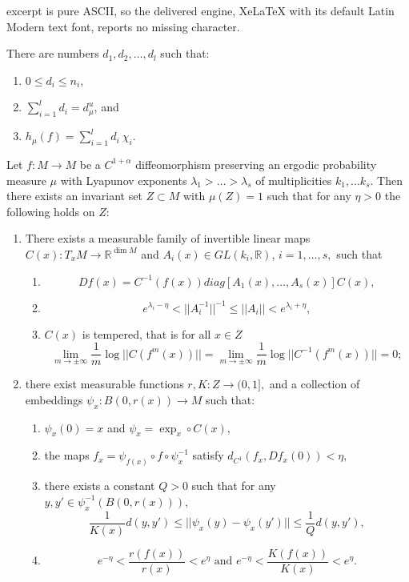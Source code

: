 \documentclass[10pt,a4paper]{amsart}
\begin{document}
excerpt is pure ASCII, so the delivered engine, XeLaTeX with its default Latin Modern text font, reports no missing character.
\begin{thm}\label{thm:LY}
There are numbers $d_1, d_2, \ldots, d_l$ such that:
\begin{enumerate}
\item $0\leq d_i\leq n_i$,
\item $\sum_{i=1}^l d_i = d_{\mu}^u$, and
\item $h_{\mu}(f)= \sum_{i=1}^l  d_i ~ \chi_i$.
\end{enumerate}
\end{thm}

\begin{thm}\label{thm:Pes}
Let $f : M \to M$ be a $C^{1+\alpha}$ diffeomorphism preserving an ergodic probability measure $\mu$
with Lyapunov exponents $\lambda_1 > \ldots > \lambda_s$ of multiplicities $k_1, \ldots k_s$.
Then there exists an invariant set $Z\subset M$ with $\mu(Z)=1$ such that for any $\eta>0$ the following holds on $Z$:
\begin{enumerate}
\item There exists a measurable family of invertible linear maps $C(x): T_xM \to \mathbb{R}^{\dim M}$ and $A_i(x)\in GL(k_i, \mathbb{R})$, $i=1, \ldots ,s,$ such that

\begin{enumerate}
\item\label{eqn:Oseledecsplit}
$$Df(x)= C^{-1}(f(x)) diag[ A_1(x), \ldots, A_s(x)  ] C(x),$$

\item\label{eqn:norms}
$$  e^{\lambda_i-\eta} < ||A_i^{-1}||^{-1} \leq ||A_i|| < e^{\lambda_i+\eta} ,  $$ 

\item\label{eqn:temp} 
$C(x)$ is tempered, that is for all $x\in Z$ $$  \lim_{m\to \pm \infty  }  \frac{1}{m}   \log ||   C(f^m(x))  ||   =    \lim_{m\to \pm \infty  }  \frac{1}{m}   \log ||   C^{-1}(f^m(x))  ||  =0;      $$
\end{enumerate}

\item there exist measurable functions $r,K: Z \to (0,1],$ and a collection of embeddings $\psi_x:  B(0, r(x)) \to M$ such that:

\begin{enumerate}
\item   $\psi_x(0) = x $ and $\psi_x = \exp_x \circ C(x),$

\item the maps $f_x = \psi_{f(x)}    \circ f   \circ \psi^{-1}_x$ satisfy   $d_{C^1}(f_x, Df_x(0))<\eta,$

\item there exists a constant $Q>0$ such that  for any $y,y'\in   \psi^{-1}_x(B(0,r(x))),$
$$      \frac{1}{K(x)}d(y,y')   \leq    ||  \psi_x(y) -  \psi_x(y')  ||   \leq    \frac{1}{Q}d(y,y')  ,$$

\item  $$  e^{-\eta}  < \frac{r(f(x))}{r(x)} < e^{\eta}  \text{ and } e^{-\eta}  < \frac{K(f(x))}{K(x)} < e^{\eta}  .$$
\end{enumerate}
\end{enumerate}
\end{thm}
\end{document}
